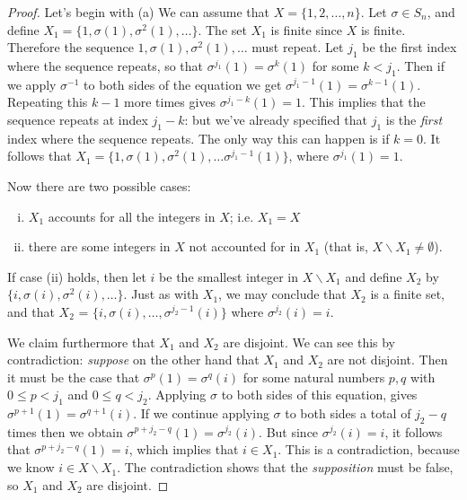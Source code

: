 \begin{proof}
Let's begin with (a)
We can assume that $X = \{ 1, 2, \ldots, n \}$. Let $\sigma \in S_n$,
and define $X_1 = \{1,  \sigma(1), \sigma^2(1), \ldots \}$. The set $X_1$ is finite since $X$ is finite. Therefore the sequence  $1, \sigma(1), \sigma^2(1), \ldots $ must repeat. Let $j_1$ be the first index where the sequence repeats, so that   $\sigma^{j_1}(1) = \sigma^k(1)$ for some $k < j_1$.  Then if we apply $\sigma^{-1}$  to both sides of the equation we get 
$\sigma^{j_1-1}(1) = \sigma^{k-1}(1)$. Repeating this $k-1$ more times gives $\sigma^{j_1-k}(1) = 1$. This implies that the sequence repeats at index $j_1-k$: but we've already specified that $j_1$ is the \emph{first} index where the sequence repeats. The only way this can happen is if $k=0$. It follows that $X_1 = \{1, \sigma(1), \sigma^2(1), \ldots \sigma^{j_1-1}(1) \}$, where $\sigma^{j_1}(1) = 1$.

Now there are two possible cases: 

\begin{enumerate}[(i)]
\item
$X_1$ accounts for all the integers in $X$; i.e. $X_1 = X$ 
\item
there are some integers in $X$ not accounted for in $X_1$ (that is, $X \backslash X_1 \neq \emptyset$).  
\end{enumerate}

If case (ii) holds, then  let $i$ be the smallest integer
in $X \backslash X_1$ and define $X_2$ by $\{ i, \sigma(i),
\sigma^2(i), \ldots \}$. Just as with $X_1$, we may conclude that $X_2$ is a finite set, and that $X_2$ = $\{ i, \sigma(i), \ldots, \sigma^{j_2-1}(i) \}$ where $\sigma^{j_2}(i) = i$.

We claim furthermore that  $X_1$ and $X_2$ are disjoint. We can see this by contradiction: \emph{suppose} on the other hand that $X_1$ and $X_2$ are not disjoint. Then it must be the case that $\sigma^p(1) = \sigma^q(i)$ for some natural numbers $p, q$ with $0 \le p < j_1$ and $0 \le q < j_2$. Applying $\sigma$ to both sides of this equation, gives $\sigma^{p+1}(1) = \sigma^{q+1}(i)$. If we  continue applying $\sigma$ to both sides a total of $j_2 - q$ times then we obtain $\sigma^{p+j_2 - q}(1) = \sigma^{j_2}(i)$. But since $\sigma^{j_2}(i) = i$, it follows that $\sigma^{p+j_2 - q}(1) = i$, which implies that $i \in X_1$. This is a contradiction, because we know $i \in X \backslash X_1$. The contradiction shows that the \emph{supposition} must be false, so $X_1$ and $X_2$ are disjoint.


\end{proof}
